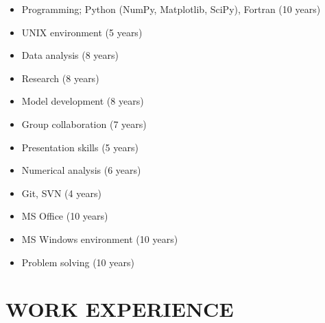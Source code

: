 \documentclass[letter, margin, 10pt]{res} %
\begin{document}
\begin{resume}
\begin{itemize}[noitemsep,topsep=0pt,parsep=0pt,partopsep=0pt]
\item Programming; Python (NumPy, Matplotlib, SciPy), Fortran \hfill (10 years)
\item UNIX environment \hfill (5 years)
\item Data analysis \hfill (8 years)
\item Research \hfill (8 years)
\item Model development \hfill (8 years)
\item Group collaboration \hfill (7 years)
\item Presentation skills \hfill (5 years)
\item Numerical analysis \hfill (6 years)
\item Git, SVN \hfill (4 years)
\item MS Office \hfill(10 years)
\item MS Windows environment \hfill (10 years)
\item Problem solving \hfill (10 years)
\end{itemize}

\section{WORK EXPERIENCE}


\end{resume}
\end{document}
